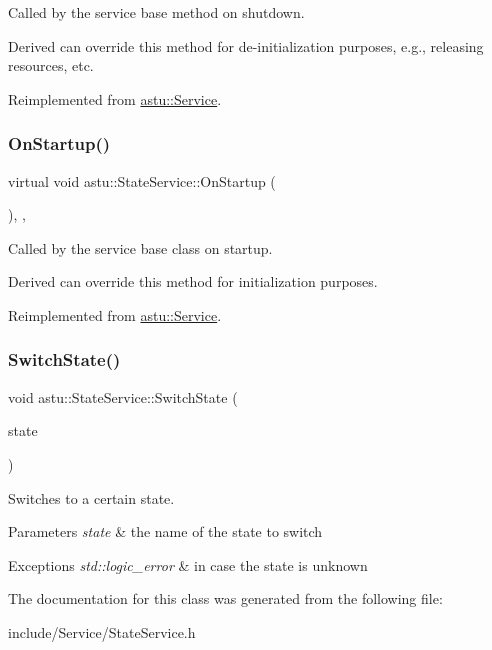 Called by the service base method on shutdown.

Derived can override this method for de-\/initialization purposes, e.\+g., releasing resources, etc. 

Reimplemented from \hyperlink{classastu_1_1Service_a1e1dff727df791c57fae782d8a613c5f}{astu\+::\+Service}.

\mbox{\label{classastu_1_1StateService_a06419feca958b72db99dde6eda301f86}} 
\subsubsection{\texorpdfstring{On\+Startup()}{OnStartup()}}
{\footnotesize\ttfamily virtual void astu\+::\+State\+Service\+::\+On\+Startup (\begin{DoxyParamCaption}{ }\end{DoxyParamCaption})\hspace{0.3cm}{\ttfamily [override]}, {\ttfamily [protected]}, {\ttfamily [virtual]}}

Called by the service base class on startup.

Derived can override this method for initialization purposes. 

Reimplemented from \hyperlink{classastu_1_1Service_a357dc663e000b1f086f681ec3c459bfe}{astu\+::\+Service}.

\mbox{\label{classastu_1_1StateService_a3396bad71a626dd749295375759015d3}} 
\subsubsection{\texorpdfstring{Switch\+State()}{SwitchState()}}
{\footnotesize\ttfamily void astu\+::\+State\+Service\+::\+Switch\+State (\begin{DoxyParamCaption}\item[{const std\+::string \&}]{state }\end{DoxyParamCaption})}

Switches to a certain state.


\begin{DoxyParams}{Parameters}
{\em state} & the name of the state to switch \\
\hline
\end{DoxyParams}

\begin{DoxyExceptions}{Exceptions}
{\em std\+::logic\+\_\+error} & in case the state is unknown \\
\hline
\end{DoxyExceptions}


The documentation for this class was generated from the following file\+:\begin{DoxyCompactItemize}
\item 
include/\+Service/State\+Service.\+h\end{DoxyCompactItemize}
